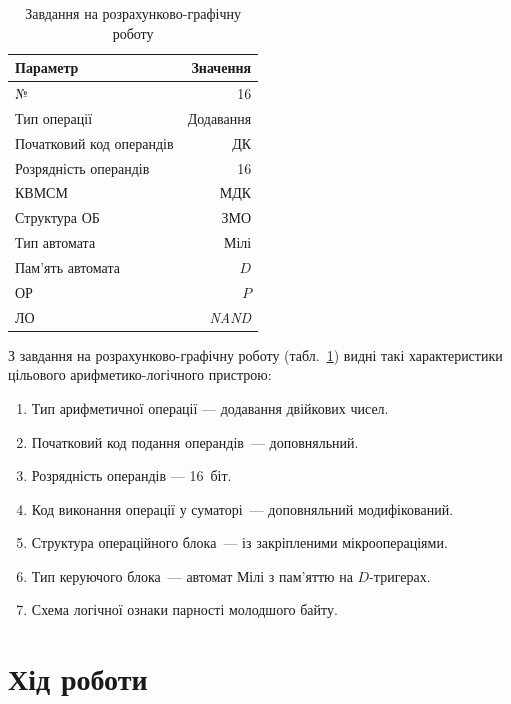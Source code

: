 \documentclass[
	a4paper,
	oneside,
	DIV = 12,
	12pt,
	headings = normal,
]{scrartcl}
\begin{document}
		\begin{table}[!htbp]
			\centering
			\caption{Завдання на розрахунково-графічну роботу}
			\label{tab:rgr-task}
			\begin{tabular}{lr}
				\toprule
					Параметр & Значення \\
				\midrule
					№                        & 16\\
					Тип операції             & Додавання\\
					Початковий код операндів & ДК\\
					Розрядність операндів    & 16\\
					КВМСМ                    & МДК\\
					Структура ОБ             & ЗМО\\
					Тип автомата             & Мілі\\
					Пам'ять автомата         & $D$\\
					ОР                       & $P$\\
					ЛО                       & \textit{NAND}\\
				\bottomrule
			\end{tabular}
		\end{table}
		З завдання на розрахунково-графічну роботу (табл.~\ref{tab:rgr-task}) видні такі характеристики цільового арифметико-логічного пристрою:
		\begin{enumerate}
			\item Тип арифметичної операції — додавання двійкових чисел.
			\item Початковий код подання операндів~— доповняльний.
			\item Розрядність операндів — 16~біт.
			\item Код виконання операції у суматорі~— доповняльний модифікований.
			\item Структура операційного блока~— із закріпленими мікроопераціями.
			\item Тип керуючого блока~— автомат Мілі з пам'яттю на $D$-тригерах.
			\item Схема логічної ознаки парності молодшого байту.
		\end{enumerate}

	\section{Хід роботи}
\end{document}
